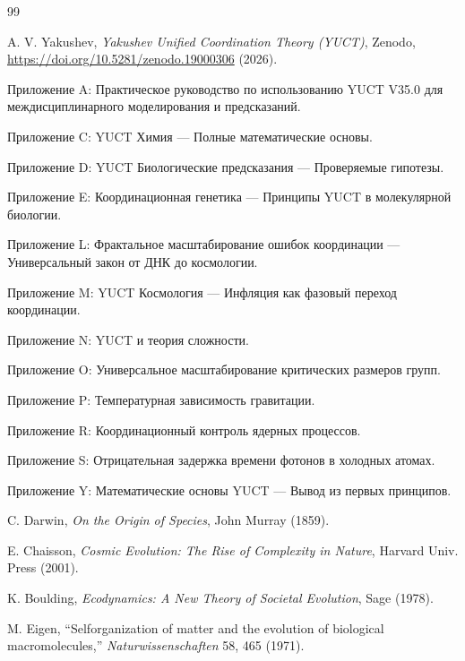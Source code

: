 \documentclass[12pt,a4paper]{article}
\theoremstyle{remark}
\begin{document}
	\begin{thebibliography}{99}
		
		A. V. Yakushev, \emph{Yakushev Unified Coordination Theory (YUCT)}, Zenodo, \url{https://doi.org/10.5281/zenodo.19000306} (2026).
		
		Приложение A: Практическое руководство по использованию YUCT V35.0 для междисциплинарного моделирования и предсказаний.
		
		Приложение C: YUCT Химия — Полные математические основы.
		
		Приложение D: YUCT Биологические предсказания — Проверяемые гипотезы.
		
		Приложение E: Координационная генетика — Принципы YUCT в молекулярной биологии.
		
		Приложение L: Фрактальное масштабирование ошибок координации — Универсальный закон от ДНК до космологии.
		
		Приложение M: YUCT Космология — Инфляция как фазовый переход координации.
		
		Приложение N: YUCT и теория сложности.
		
		Приложение O: Универсальное масштабирование критических размеров групп.
		
		Приложение P: Температурная зависимость гравитации.
		
		Приложение R: Координационный контроль ядерных процессов.
		
		Приложение S: Отрицательная задержка времени фотонов в холодных атомах.
		
		Приложение Y: Математические основы YUCT — Вывод из первых принципов.
		
		C. Darwin, \emph{On the Origin of Species}, John Murray (1859).
		
		E. Chaisson, \emph{Cosmic Evolution: The Rise of Complexity in Nature}, Harvard Univ. Press (2001).
		
		K. Boulding, \emph{Ecodynamics: A New Theory of Societal Evolution}, Sage (1978).
		
		M. Eigen, ``Selforganization of matter and the evolution of biological macromolecules,'' \emph{Naturwissenschaften} 58, 465 (1971).
		

\end{thebibliography}
\end{document}
